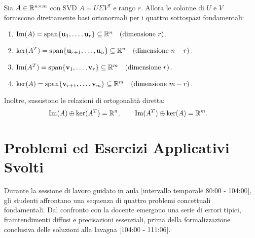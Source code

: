 \begin{theorem}
\label{thm:sottospazi-svd-generale}
Sia $A \in \mathbb{R}^{n \times m}$ con SVD $A = U \Sigma V^T$ e rango $r$. Allora le colonne di $U$ e $V$ forniscono direttamente basi ortonormali per i quattro sottospazi fondamentali:
\begin{enumerate}
    \item $\operatorname{Im}(A) = \operatorname{span}\{\mathbf{u}_1, \dots, \mathbf{u}_r\} \subseteq \mathbb{R}^n \quad (\text{dimensione } r)$.
    \item $\ker(A^T) = \operatorname{span}\{\mathbf{u}_{r+1}, \dots, \mathbf{u}_n\} \subseteq \mathbb{R}^n \quad (\text{dimensione } n - r)$.
    \item $\operatorname{Im}(A^T) = \operatorname{span}\{\mathbf{v}_1, \dots, \mathbf{v}_r\} \subseteq \mathbb{R}^m \quad (\text{dimensione } r)$.
    \item $\ker(A) = \operatorname{span}\{\mathbf{v}_{r+1}, \dots, \mathbf{v}_m\} \subseteq \mathbb{R}^m \quad (\text{dimensione } m - r)$.
\end{enumerate}
Inoltre, sussistono le relazioni di ortogonalit\`a diretta:
\begin{equation}
    \operatorname{Im}(A) \oplus \ker(A^T) = \mathbb{R}^n, \qquad \operatorname{Im}(A^T) \oplus \ker(A) = \mathbb{R}^m.
\end{equation}
\end{theorem}

\FloatBarrier
\section{Problemi ed Esercizi Applicativi Svolti}
\label{sec:svd-problemi-esercizi}

Durante la sessione di lavoro guidato in aula [intervallo temporale 80:00 - 104:00], gli studenti affrontano una sequenza di quattro problemi concettuali fondamentali. Dal confronto con la docente emergono una serie di errori tipici, fraintendimenti diffusi e precisazioni essenziali, prima della formalizzazione conclusiva delle soluzioni alla lavagna [104:00 - 111:06].

